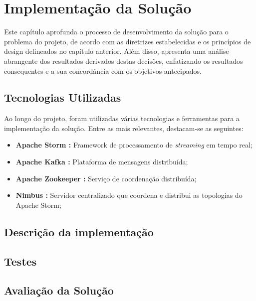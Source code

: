 \chapter{Implementação da Solução}
\label{sec:4-Implementacao}

Este capítulo aprofunda o processo de desenvolvimento da solução para o problema do
projeto, de acordo com as diretrizes estabelecidas e os princípios de design delineados no
capítulo anterior. Além disso, apresenta uma análise abrangente dos resultados derivados destas 
decisões, enfatizando os resultados consequentes e a sua concordância com os objetivos antecipados.

\section{Tecnologias Utilizadas}

Ao longo do projeto, foram utilizadas várias tecnologias e ferramentas para a implementação da solução.
Entre as mais relevantes, destacam-se as seguintes:

\begin{itemize}
  \item \textbf{Apache Storm \cite{storm}:} Framework de processamento de \textit{streaming} em tempo real;
  \item \textbf{Apache Kafka \cite{kafka}:} Plataforma de mensagens distribuída;
  \item \textbf{Apache Zookeeper \cite{zookeeper}:} Serviço de coordenação distribuída;
  \item \textbf{Nimbus \cite{nimbus}:} Servidor centralizado que coordena e distribui as topologias do Apache Storm;
\end{itemize}

\section{Descrição da implementação}


\section{Testes}


\section{Avaliação da Solução}

